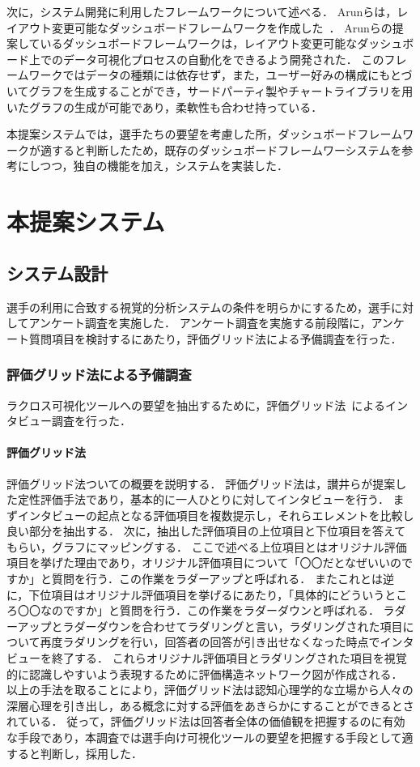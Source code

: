 \documentclass[sotsuron]{kuee}
\begin{document}
	次に，システム開発に利用したフレームワークについて述べる．	
	Arunらは，レイアウト変更可能なダッシュボードフレームワークを作成した~\cite{dashboard}．
	Arunらの提案しているダッシュボードフレームワークは，レイアウト変更可能なダッシュボード上でのデータ可視化プロセスの自動化をできるよう開発された．
	このフレームワークではデータの種類には依存せず，また，ユーザー好みの構成にもとづいてグラフを生成することができ，サードパーティ製やチャートライブラリを用いたグラフの生成が可能であり，柔軟性も合わせ持っている．
	
	本提案システムでは，選手たちの要望を考慮した所，ダッシュボードフレームワークが適すると判断したため，既存のダッシュボードフレームワーシステムを参考にしつつ，独自の機能を加え，システムを実装した．

\chapter{本提案システム}
	\section{システム設計}
		選手の利用に合致する視覚的分析システムの条件を明らかにするため，選手に対してアンケート調査を実施した．
		アンケート調査を実施する前段階に，アンケート質問項目を検討するにあたり，評価グリッド法による予備調査を行った．
		\subsection{評価グリッド法による予備調査}
			ラクロス可視化ツールへの要望を抽出するために，評価グリッド法~\cite{EGM}によるインタビュー調査を行った．
			\subsubsection{評価グリッド法}
				評価グリッド法ついての概要を説明する．
				評価グリッド法は，讃井らが提案した定性評価手法であり，基本的に一人ひとりに対してインタビューを行う．
				まずインタビューの起点となる評価項目を複数提示し，それらエレメントを比較し良い部分を抽出する．
				次に，抽出した評価項目の上位項目と下位項目を答えてもらい，グラフにマッピングする．
				ここで述べる上位項目とはオリジナル評価項目を挙げた理由であり，オリジナル評価項目について「〇〇だとなぜいいのですか」と質問を行う．この作業をラダーアップと呼ばれる．
				またこれとは逆に，下位項目はオリジナル評価項目を挙げるにあたり，「具体的にどういうところ〇〇なのですか」と質問を行う．この作業をラダーダウンと呼ばれる．
				ラダーアップとラダーダウンを合わせてラダリングと言い，ラダリングされた項目について再度ラダリングを行い，回答者の回答が引き出せなくなった時点でインタビューを終了する．
				これらオリジナル評価項目とラダリングされた項目を視覚的に認識しやすいよう表現するために評価構造ネットワーク図が作成される．
				以上の手法を取ることにより，評価グリッド法は認知心理学的な立場から人々の深層心理を引き出し，ある概念に対する評価をあきらかにすることができるとされている．
				従って，評価グリッド法は回答者全体の価値観を把握するのに有効な手段であり，本調査では選手向け可視化ツールの要望を把握する手段として適すると判断し，採用した．
\end{document}
